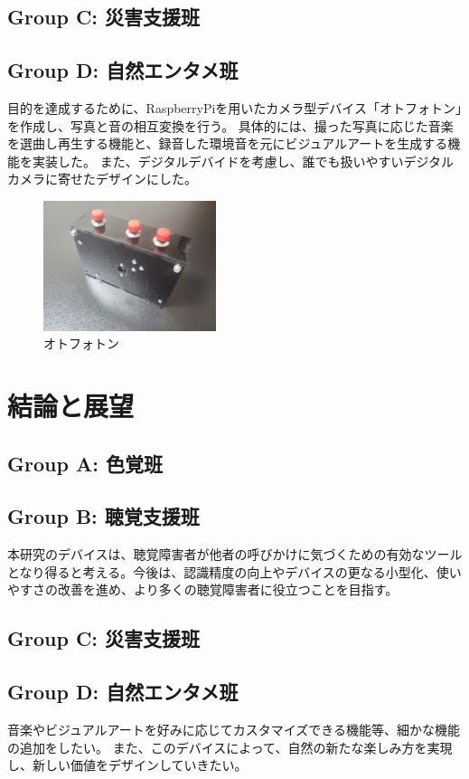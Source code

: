 \subsection{Group C: 災害支援班}

\subsection{Group D: 自然エンタメ班}
目的を達成するために、RaspberryPiを用いたカメラ型デバイス「オトフォトン」を作成し、写真と音の相互変換を行う。
具体的には、撮った写真に応じた音楽を選曲し再生する機能と、録音した環境音を元にビジュアルアートを生成する機能を実装した。
また、デジタルデバイドを考慮し、誰でも扱いやすいデジタルカメラに寄せたデザインにした。

\begin{figure}[h]
  \centering
  \includegraphics[width=0.45\textwidth]{pages/report/images/otophoton.jpg}
  \caption{オトフォトン}
  \label{fig:otophoton}
\end{figure}

\section{結論と展望}
\subsection{Group A: 色覚班}

\subsection{Group B: 聴覚支援班}
本研究のデバイスは、聴覚障害者が他者の呼びかけに気づくための有効なツールとなり得ると考える。今後は、認識精度の向上やデバイスの更なる小型化、使いやすさの改善を進め、より多くの聴覚障害者に役立つことを目指す。
\subsection{Group C: 災害支援班}

\subsection{Group D: 自然エンタメ班}
音楽やビジュアルアートを好みに応じてカスタマイズできる機能等、細かな機能の追加をしたい。
また、このデバイスによって、自然の新たな楽しみ方を実現し、新しい価値をデザインしていきたい。
